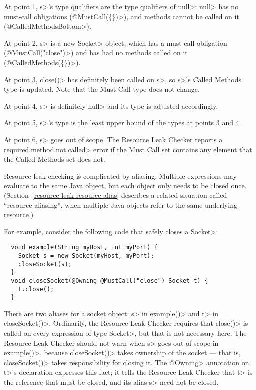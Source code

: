 At point 1, \<s>'s type qualifiers are the type qualifiers of \<null>:
\<null> has no must-call obligations (\<@MustCall(\{\})>),
and methods cannot be called on it (\<@CalledMethodsBottom>).

At point 2, \<s> is a new \<Socket> object, which
has a must-call obligation (\<@MustCall("close")>)
and has had no methods called on it (\<@CalledMethods(\{\})>).

At point 3, \<close()> has definitely been called on \<s>, so
\<s>'s Called Methods type is updated. Note that the Must Call type
does not change.

At point 4, \<s> is definitely \<null> and its type is adjusted accordingly.

At point 5, \<s>'s type is the least upper bound of the types at points 3
and 4.

At point 6, \<s> goes out of scope.  The Resource Leak Checker reports a
\<required.method.not.called> error if the Must Call set contains any
element that the Called Methods set does not.



Resource leak checking is complicated by aliasing.  Multiple expressions
may evaluate to the same Java object, but each object only needs to be
closed once.  (Section~\ref{resource-leak-resource-alias} describes a
related situation called ``resource aliasing'', when multiple Java objects
refer to the same underlying resource.)

For example, consider the following code that safely closes a \<Socket>:

\begin{verbatim}
  void example(String myHost, int myPort) {
    Socket s = new Socket(myHost, myPort);
    closeSocket(s);
  }
  void closeSocket(@Owning @MustCall("close") Socket t) {
    t.close();
  }
\end{verbatim}

There are two aliases for a socket object: \<s> in \<example()> and \<t> in
\<closeSocket()>.  Ordinarily, the Resource Leak Checker requires that
\<close()> is called on every expression of type \<Socket>, but that is not
necessary here.  The Resource Leak Checker should not warn when
\<s> goes out of scope in \<example()>, because \<closeSocket()> takes ownership
of the socket --- that is, \<closeSocket()> takes responsibility for closing
it. The \<@Owning> annotation on \<t>'s declaration expresses this fact; it
tells the Resource Leak Checker that \<t> is the reference that must be
closed, and its alias \<s> need not be closed.

